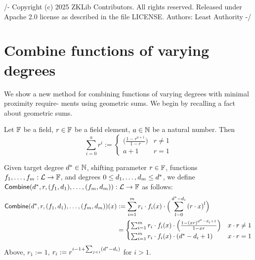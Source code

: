 /-
Copyright (c) 2025 ZKLib Contributors. All rights reserved.
Released under Apache 2.0 license as described in the file LICENSE.
Authors: Least Authority
-/

\section{Combine functions of varying degrees}\label{sec:combine}
We show a new method for combining functions of varying degrees with minimal proximity require- ments using geometric sums. We begin by recalling a fact about geometric sums.

\begin{fact}\label{fact:geometric_sum}
\leanok
    Let $\mathbb{F}$ be a field, $r\in\mathbb{F}$ be a field element, $a\in\mathbb{N}$ be a natural number. Then
    \[
        \sum_{i=0}^{a}r^i:=
        \begin{cases}
        \Big(\frac{1-r^{a+1}}{1-r}\Big) & r\neq 1 \\
        a+1 & r=1
        \end{cases}
    \]
\end{fact}

\begin{definition}\label{def:combine}
\leanok
    Given target degree $d^*\in\mathbb{N}$, shifting parameter $r\in\mathbb{F}$, functions $f_1,\ldots,f_m:\mathcal{L}\rightarrow\mathbb{F}$, and degrees $0\leq d_1,\ldots,d_m\leq {d}^*$, we define $\mathsf{Combine}(d^*,r,(f_1,d_1),\ldots,(f_m,d_m)):\mathcal{L}\rightarrow\mathbb{F}$ as follows:
    \begin{align*}
        \mathsf{Combine}({d}^*,r,(f_1,d_1),\ldots,(f_m,d_m))(x)&:=\sum_{i=1}^{m}r_i\cdot f_i(x)\cdot \Big(\sum_{l=0}^{d^*-d_i}{(r\cdot x)}^l\Big) \\
        &= 
        \begin{cases}
            \sum_{i=1}^{m}r_i\cdot f_i(x)\cdot \Big(\frac{1-{(xr)}^{d^*-d_i+1}}{1-xr}\Big) & x\cdot r\neq 1\\
            \sum_{i=1}^{m}r_i\cdot f_i(x)\cdot (d^*-d_i+1) & x\cdot r= 1
        \end{cases}
    \end{align*}
Above, $r_1:=1$, $r_i:=r^{i-1+\sum_{j<i}(d^*-d_i)}$ for $i>1$.
\end{definition}

